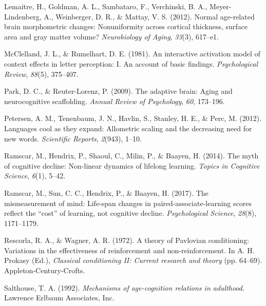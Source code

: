 \documentclass[
  man]{apa6}
\newlength{\cslhangindent}
\newlength{\cslentryspacingunit} %
\newenvironment{CSLReferences}[2] %
 {%
  \setlength{\parindent}{0pt}
  \ifodd #1
  \let\oldpar\par
  \def\par{\hangindent=\cslhangindent\oldpar}
  \fi
  \setlength{\parskip}{#2\cslentryspacingunit}
 }%
 {}
\begin{document}
\begin{CSLReferences}{1}{0}
\leavevmode{}%
Lemaitre, H., Goldman, A. L., Sambataro, F., Verchinski, B. A., Meyer-Lindenberg, A., Weinberger, D. R., \& Mattay, V. S. (2012). Normal age-related brain morphometric changes: Nonuniformity across cortical thickness, surface area and gray matter volume? \emph{Neurobiology of Aging}, \emph{33}(3), 617--e1.

\leavevmode{}%
McClelland, J. L., \& Rumelhart, D. E. (1981). An interactive activation model of context effects in letter perception: I. An account of basic findings. \emph{Psychological Review}, \emph{88}(5), 375--407.

\leavevmode{}%
Park, D. C., \& Reuter-Lorenz, P. (2009). The adaptive brain: Aging and neurocognitive scaffolding. \emph{Annual Review of Psychology}, \emph{60}, 173--196.

\leavevmode{}%
Petersen, A. M., Tenenbaum, J. N., Havlin, S., Stanley, H. E., \& Perc, M. (2012). Languages cool as they expand: Allometric scaling and the decreasing need for new words. \emph{Scientific Reports}, \emph{2}(943), 1--10.

\leavevmode{}%
Ramscar, M., Hendrix, P., Shaoul, C., Milin, P., \& Baayen, H. (2014). The myth of cognitive decline: Non-linear dynamics of lifelong learning. \emph{Topics in Cognitive Science}, \emph{6}(1), 5--42.

\leavevmode{}%
Ramscar, M., Sun, C. C., Hendrix, P., \& Baayen, H. (2017). The mismeasurement of mind: Life-span changes in paired-associate-learning scores reflect the {``cost''} of learning, not cognitive decline. \emph{Psychological Science}, \emph{28}(8), 1171--1179.

\leavevmode{}%
Rescorla, R. A., \& Wagner, A. R. (1972). {A theory of Pavlovian conditioning: Variations in the effectiveness of reinforcement and non-reinforcement}. In A. H. Prokasy (Ed.), \emph{Classical conditioning II: Current research and theory} (pp. 64--69). Appleton-Century-Crofts.

\leavevmode{}%
Salthouse, T. A. (1992). \emph{Mechanisms of age-cognition relations in adulthood}. Lawrence Erlbaum Associates, Inc.


\end{CSLReferences}
\end{document}
